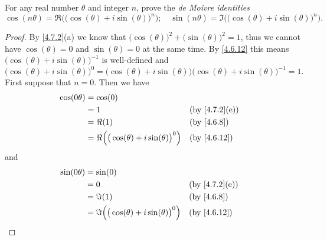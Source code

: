 \begin{ex}\label{ex:4.7.7}
  For any real number \(\theta\) and integer \(n\), prove the \emph{de Moivre identities}
  \[
    \cos(n \theta) = \Re\Big(\big(\cos(\theta) + i \sin(\theta)\big)^n\Big); \quad \sin(n \theta) = \Im\Big(\big(\cos(\theta) + i \sin(\theta)\big)^n\Big).
  \]
\end{ex}

\begin{proof}
  By \cref{4.7.2}(a) we know that \(\big(\cos(\theta)\big)^2 + \big(\sin(\theta)\big)^2 = 1\), thus we cannot have \(\cos(\theta) = 0\) and \(\sin(\theta) = 0\) at the same time.
  By \cref{4.6.12} this means \(\big(\cos(\theta) + i \sin(\theta)\big)^{-1}\) is well-defined and
  \[
    \big(\cos(\theta) + i \sin(\theta)\big)^0 = \big(\cos(\theta) + i \sin(\theta)\big) \big(\cos(\theta) + i \sin(\theta)\big)^{-1} = 1.
  \]
  First suppose that \(n = 0\).
  Then we have
  \begin{align*}
    \cos(0 \theta) & = \cos(0)                                                                                 \\
                   & = 1                                                      &  & \text{(by \cref{4.7.2}(e))} \\
                   & = \Re(1)                                                 &  & \text{(by \cref{4.6.8})}    \\
                   & = \Re\Big(\big(\cos(\theta) + i \sin(\theta)\big)^0\Big) &  & \text{(by \cref{4.6.12})}
  \end{align*}
  and
  \begin{align*}
    \sin(0 \theta) & = \sin(0)                                                                                 \\
                   & = 0                                                      &  & \text{(by \cref{4.7.2}(e))} \\
                   & = \Im(1)                                                 &  & \text{(by \cref{4.6.8})}    \\
                   & = \Im\Big(\big(\cos(\theta) + i \sin(\theta)\big)^0\Big) &  & \text{(by \cref{4.6.12})}
  \end{align*}


\end{proof}
